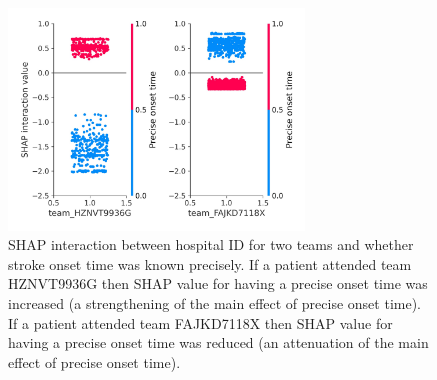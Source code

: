 \begin{figure}
\centering
\includegraphics[width=0.7\textwidth]{./images/12aa_onset_time_type_interaction_example}
\caption{SHAP interaction between hospital ID for two teams and whether stroke onset time was known precisely. If a patient attended team HZNVT9936G then SHAP value for having a precise onset time was increased (a strengthening of the main effect of precise onset time). If a patient attended team FAJKD7118X then SHAP value for having a precise onset time was reduced (an attenuation of the main effect of precise onset time).}
\end{figure}










